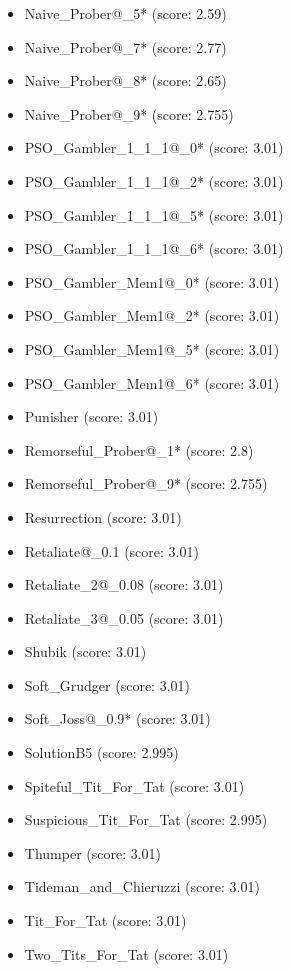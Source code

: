 \begin{appendices}
\begin{itemize}
\begin{multicols}{3}
\begin{itemize}
            \item Naive\_Prober@\_5* (score: 2.59)
            \item Naive\_Prober@\_7* (score: 2.77)
            \item Naive\_Prober@\_8* (score: 2.65)
            \item Naive\_Prober@\_9* (score: 2.755)
            \item PSO\_Gambler\_1\_1\_1@\_0* (score: 3.01)
            \item PSO\_Gambler\_1\_1\_1@\_2* (score: 3.01)
            \item PSO\_Gambler\_1\_1\_1@\_5* (score: 3.01)
            \item PSO\_Gambler\_1\_1\_1@\_6* (score: 3.01)
            \item PSO\_Gambler\_Mem1@\_0* (score: 3.01)
            \item PSO\_Gambler\_Mem1@\_2* (score: 3.01)
            \item PSO\_Gambler\_Mem1@\_5* (score: 3.01)
            \item PSO\_Gambler\_Mem1@\_6* (score: 3.01)
            \item Punisher (score: 3.01)
            \item Remorseful\_Prober@\_1* (score: 2.8)
            \item Remorseful\_Prober@\_9* (score: 2.755)
            \item Resurrection (score: 3.01)
            \item Retaliate@\_0.1 (score: 3.01)
            \item Retaliate\_2@\_0.08 (score: 3.01)
            \item Retaliate\_3@\_0.05 (score: 3.01)
            \item Shubik (score: 3.01)
            \item Soft\_Grudger (score: 3.01)
            \item Soft\_Joss@\_0.9* (score: 3.01)
            \item SolutionB5 (score: 2.995)
            \item Spiteful\_Tit\_For\_Tat (score: 3.01)
            \item Suspicious\_Tit\_For\_Tat (score: 2.995)
            \item Thumper (score: 3.01)
            \item Tideman\_and\_Chieruzzi (score: 3.01)
            \item Tit\_For\_Tat (score: 3.01)
            \item Two\_Tits\_For\_Tat (score: 3.01)

\end{itemize}
\end{multicols}
\end{itemize}
\end{appendices}
